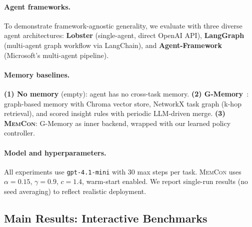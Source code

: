 \documentclass{article} %
\theoremstyle{plain}
\theoremstyle{definition}
\theoremstyle{remark}
\newcommand{\ours}{\textsc{MemCon}\xspace}
\begin{document}
\paragraph{Agent frameworks.}
To demonstrate framework-agnostic generality, we evaluate with three diverse agent architectures:
\textbf{Lobster} (single-agent, direct OpenAI API),
\textbf{LangGraph} (multi-agent graph workflow via LangChain), and
\textbf{Agent-Framework} (Microsoft's multi-agent pipeline).

\paragraph{Memory baselines.}
\textbf{(1) No memory} (empty): agent has no cross-task memory.
\textbf{(2) G-Memory}~\citep{gmemory}: graph-based memory with Chroma vector store, NetworkX task graph (k-hop retrieval), and scored insight rules with periodic LLM-driven merge.
\textbf{(3) \ours}: G-Memory as inner backend, wrapped with our learned policy controller.

\paragraph{Model and hyperparameters.}
All experiments use \texttt{gpt-4.1-mini} with 30 max steps per task.
\ours uses $\alpha\!=\!0.15$, $\gamma\!=\!0.9$, $c\!=\!1.4$, warm-start enabled.
We report single-run results (no seed averaging) to reflect realistic deployment.


\subsection{Main Results: Interactive Benchmarks}
\end{document}
